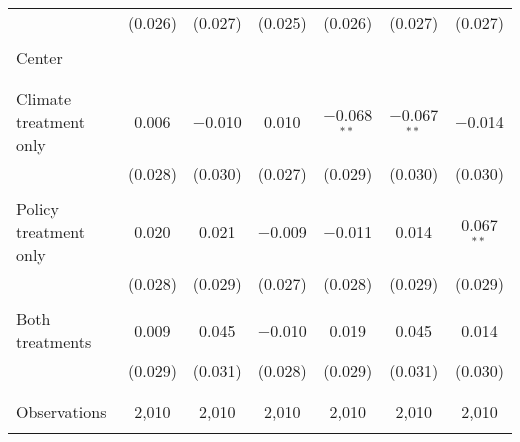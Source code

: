 \begin{tabular}{@{\extracolsep{5pt}}lcccccc}
  & (0.026) & (0.027) & (0.025) & (0.026) & (0.027) & (0.027) \\ 
  & & & & & & \\ 
 Center &  &  &  &  &  &  \\ 
  &  &  &  &  &  &  \\ 
  & & & & & & \\ 
 Climate treatment only & 0.006 & $-$0.010 & 0.010 & $-$0.068$^{**}$ & $-$0.067$^{**}$ & $-$0.014 \\ 
  & (0.028) & (0.030) & (0.027) & (0.029) & (0.030) & (0.030) \\ 
  & & & & & & \\ 
 Policy treatment only & 0.020 & 0.021 & $-$0.009 & $-$0.011 & 0.014 & 0.067$^{**}$ \\ 
  & (0.028) & (0.029) & (0.027) & (0.028) & (0.029) & (0.029) \\ 
  & & & & & & \\ 
 Both treatments & 0.009 & 0.045 & $-$0.010 & 0.019 & 0.045 & 0.014 \\ 
  & (0.029) & (0.031) & (0.028) & (0.029) & (0.031) & (0.030) \\ 
  & & & & & & \\ 
\hline \\[-1.8ex] 

Observations & 2,010 & 2,010 & 2,010 & 2,010 & 2,010 & 2,010 \\ 
\hline 
\hline \\[-1.8ex] 
\end{tabular} 